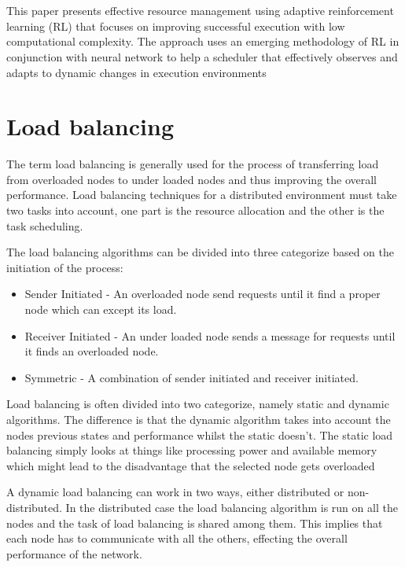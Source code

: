 \documentclass{cslthse-msc}
\begin{document}
\\\\
This paper presents effective resource management using adaptive reinforcement learning (RL) that focuses on improving successful execution with low computational complexity. The approach uses an emerging methodology of RL in conjunction with neural network to help a scheduler that effectively observes and adapts to dynamic changes in execution environments \cite{imprRelAdaptRL}
\fi

\section{Load balancing}
The term load balancing is generally used for the process of transferring load from overloaded nodes to under loaded nodes and thus improving the overall performance. Load balancing techniques for a distributed environment must take two tasks into account, one part is the resource allocation and the other is the task scheduling. 

The load balancing algorithms can be divided into three categorize based on the initiation of the process:
\begin{itemize}
\item Sender Initiated - An overloaded node send requests until it find a proper node which can except its load.
\item Receiver Initiated - An under loaded node sends a message for requests until it finds an overloaded node.
\item Symmetric - A combination of sender initiated and receiver initiated. 
\end{itemize}

Load balancing is often divided into two categorize, namely static and dynamic algorithms. The difference is that the dynamic algorithm takes into account the nodes previous states and performance whilst the static doesn't. The static load balancing simply looks at things like processing power and available memory which might lead to the disadvantage that the selected node gets overloaded \cite{perfAnalysisLoadCloud}

A dynamic load balancing can work in two ways, either distributed or non-distributed. In the distributed case the load balancing algorithm is run on all the nodes and the task of load  balancing is shared among them. This implies that each node has to communicate with all the others, effecting the overall performance of the network. %
\end{document}
